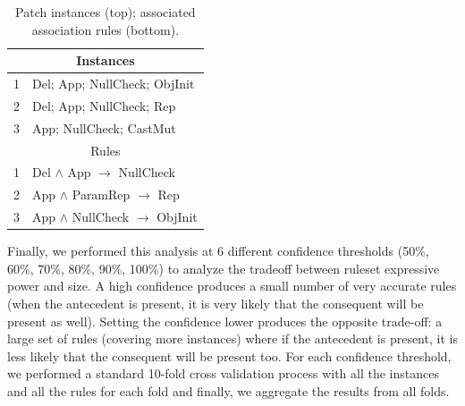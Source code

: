 \documentclass[sigconf]{acmart}
\begin{document}
\begin{table}[ht]
  \centering
  \caption{Patch instances (top); associated association rules (bottom). \label{rulesandinstances}}{\small
\begin{tabular}{ll}
\toprule
\multicolumn{2}{c}{Instances} \\
\midrule
1 & Del; App; NullCheck; ObjInit \\
2 & Del; App; NullCheck; Rep \\
3 & App; NullCheck; CastMut \\  
\midrule
 \multicolumn{2}{c}{Rules} \\                     
\midrule
1 & Del $\wedge$ App $\rightarrow$ NullCheck \\  
2 & App $\wedge$ ParamRep $\rightarrow$ Rep \\   
3 &App $\wedge$ NullCheck $\rightarrow$ ObjInit\\
\bottomrule
\end{tabular}

}
\end{table}

Finally, we performed this analysis at 6 different confidence thresholds
(50\%, 60\%, 70\%, 80\%, 90\%, 100\%) to analyze the tradeoff between ruleset expressive
power and size. A high confidence produces 
a small number of very accurate rules (when the
antecedent is present, it is very likely that the consequent will be present as
well).  Setting the confidence lower produces the opposite trade-off:
a large set of rules (covering more instances) where if the antecedent is
present, it is less likely that 
the consequent will be present too. For each confidence
threshold, we performed a standard 10-fold cross validation process with all the
instances and all the rules for each fold and finally, we aggregate the results
from all folds.

\end{document}
